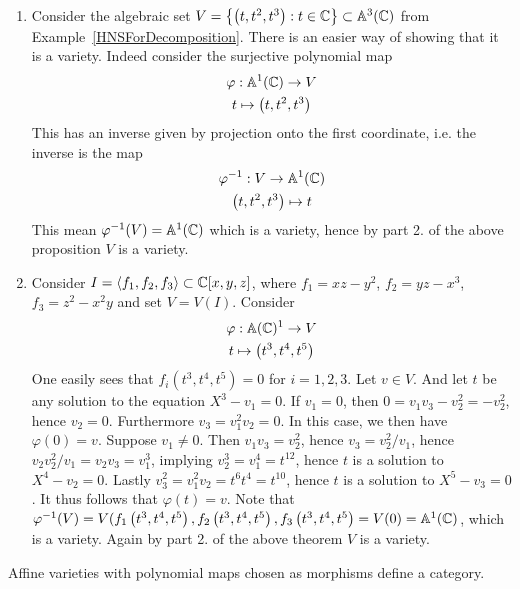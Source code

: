 \begin{example}
    \begin{enumerate}
        \item Consider the algebraic set $V=\left\{ \left(t,t^2,t^3\right) : t\in \mathbb{C}\right\}\subset \mathbb{A}^3(\mathbb{C})$ from Example~\ref{HNSForDecomposition}. There is an easier way of showing that it is a variety. Indeed consider the surjective polynomial map
        \begin{gather*}
            \varphi : \mathbb{A}^1(\mathbb{C}) \rightarrow V\\
            t\mapsto \left(t,t^2,t^3\right)
        \end{gather*}
        This has an inverse given by projection onto the first coordinate, i.e. the inverse is the map
        \begin{gather*}
            \varphi^{-1} : V \rightarrow \mathbb{A}^1(\mathbb{C})\\
            \left(t,t^2,t^3\right) \mapsto t
        \end{gather*}
        This mean $\varphi^{-1}(V)=\mathbb{A}^1(\mathbb{C})$ which is a variety, hence by part 2. of the above proposition $V$ is a variety.
        \item Consider $I=\langle f_1,f_2,f_3\rangle\subset \mathbb{C}[x,y,z]$, where $f_1=xz-y^2$, $f_2=yz-x^3$, $f_3=z^2-x^2y$ and set $V=V(I)$. Consider 
        \begin{gather*}\varphi: \mathbb{A}(\mathbb{C})^1 \rightarrow V\\ t \mapsto \left(t^3,t^4,t^5\right)\end{gather*}
        One easily sees that $f_i\left(t^3,t^4,t^5\right)=0$ for $i=1,2,3$. Let $v\in V$. And let $t$ be any solution to the equation $X^3-v_1=0$. If $v_1=0$, then $0=v_1v_3-v_2^2=-v_2^2$, hence $v_2=0$. Furthermore $v_3 = v_1^2v_2=0$. In this case, we then have $\varphi(0)=v$. Suppose $v_1\neq0$. Then $v_1v_3=v_2^2$, hence $v_3=v_2^2/v_1$, hence $v_2v_2^2/v_1=v_2v_3=v_1^3$, implying $v_2^3 =v_1^4=t^{12}$, hence $t$ is a solution to $X^4-v_2=0$. Lastly $v_3^2=v_1^2v_2=t^6t^4=t^10$, hence $t$ is a solution to $X^5-v_3=0$. It thus follows that $\varphi(t)=v$. Note that $\varphi^{-1}(V)=V(f_1\left(t^3,t^4,t^5\right),f_2\left(t^3,t^4,t^5\right),f_3\left(t^3,t^4,t^5\right) = V(0)=\mathbb{A}^1(\mathbb{C})$, which is a variety. Again by part 2. of the above theorem $V$ is a variety.
    \end{enumerate} 
\end{example}
\begin{proposition}
    Affine varieties with polynomial maps chosen as morphisms define a category. 
\end{proposition}

